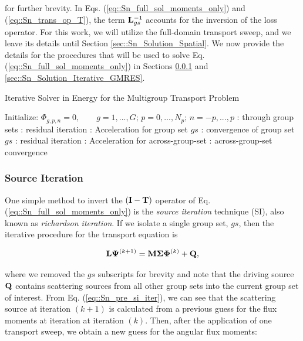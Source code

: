 \noindent for further brevity. In Eqs. (\ref{eq::Sn_full_sol_moments_only}) and (\ref{eq::Sn_trans_op_T}), the term ${\bf L}_{gs}^{-1}$ accounts for the inversion of the loss operator. For this work, we will utilize the full-domain transport sweep, and we leave its details until Section \ref{sec::Sn_Solution_Spatial}. We now provide the details for the procedures that will be used to solve Eq. (\ref{eq::Sn_full_sol_moments_only}) in Sections \ref{sec::Sn_Solution_Iterative_SI} and \ref{sec::Sn_Solution_Iterative_GMRES}.

\begin{algorithm}
\caption{Iterative Solver in Energy for the Multigroup Transport Problem}
\label{alg::Sn_Linear_Transport_Solve}
\begin{algorithmic}[1]
\State Initialize: $\Phi_{g,p,n} = 0, \qquad g=1,...,G; \, p=0,...,N_p; \, n=-p,...,p$
	: through group sets
			: residual iteration
			: Acceleration for group set $gs$
			: convergence of group set $gs$
		\EndFor
	\EndFor
	: residual iteration
	:  Acceleration for across-group-set
	: across-group-set convergence
\EndFor
\end{algorithmic}
\end{algorithm}

\subsubsection{Source Iteration}
\label{sec::Sn_Solution_Iterative_SI}

One simple method to invert the $({\bf I} - {\bf T})$ operator of Eq. (\ref{eq::Sn_full_sol_moments_only}) is the {\em source iteration} technique (SI), also known as {\em richardson iteration}. If we isolate a single group set, $gs$, then the iterative procedure for the transport equation is

\begin{equation}
\label{eq::Sn_pre_si_iter}
{\bf L} {\bf \Psi}^{(k+1)} =    {\bf M} {\bf \Sigma} {\bf \Phi}^{(k)} +  {\bf Q} ,
\end{equation}

\noindent where we removed the $gs$ subscripts for brevity and note that the driving source ${\bf Q}$ contains scattering sources from all other group sets into the current group set of interest. From Eq. (\ref{eq::Sn_pre_si_iter}), we can see that the scattering source at iteration $(k+1)$ is calculated from a previous guess for the flux moments at iteration at iteration $(k)$. Then, after the application of one transport sweep, we obtain a new guess for the angular flux moments:


